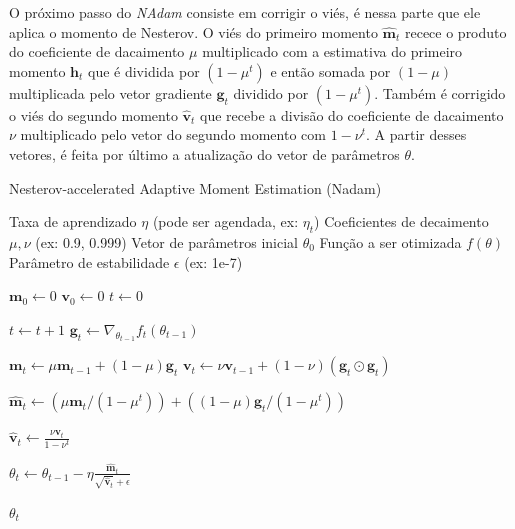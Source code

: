 O próximo passo do \textit{NAdam} consiste em corrigir o viés, é nessa parte que ele aplica o momento de Nesterov. O viés do primeiro momento $\mathbf{\hat{m}}_t$ recece o produto do coeficiente de dacaimento $\mu$ multiplicado com a estimativa do primeiro momento $\mathbf{h}_t$ que é dividida por $(1 - \mu^t)$ e então somada por $(1 - \mu)$ multiplicada pelo vetor gradiente $\mathbf{g}_t$ dividido por $(1 - \mu^t)$. Também é corrigido o viés do segundo momento $\mathbf{\hat{v}}_t$ que recebe a divisão do coeficiente de dacaimento $\nu$ multiplicado pelo vetor do segundo momento com $1 - \nu^t$. A partir desses vetores, é feita por último a atualização do vetor de parâmetros $\theta$.

\begin{algorithm}[H]
    \caption{Nesterov-accelerated Adaptive Moment Estimation (Nadam)}
    \label{alg:nadam}
    \begin{algorithmic}[1]

    \Require Taxa de aprendizado $\eta$ (pode ser agendada, ex: $\eta_t$)
    \Require Coeficientes de decaimento $\mu, \nu$ (ex: 0.9, 0.999)
    \Require Vetor de parâmetros inicial $\theta_0$
    \Require Função a ser otimizada $f(\theta)$
    \Require Parâmetro de estabilidade $\epsilon$ (ex: 1e-7)

    \State $\mathbf{m}_0 \leftarrow 0$ 
    \State $\mathbf{v}_0 \leftarrow 0$ 
    \State $t \leftarrow 0$ 

        \State $t \leftarrow t + 1$
        \State $\mathbf{g}_t \leftarrow \nabla_{\theta_{t-1}} f_t(\theta_{t-1})$
        
        \State $\mathbf{m}_t \leftarrow \mu \mathbf{m}_{t-1} + (1 - \mu) \mathbf{g}_t$
        \State $\mathbf{v}_t \leftarrow \nu \mathbf{v}_{t-1} + (1 - \nu) (\mathbf{g}_t \odot \mathbf{g}_t)$
        
        \State $\mathbf{\hat{m}}_t \leftarrow (\mu \mathbf{m}_t / (1 - \mu^t)) + ((1 - \mu) \mathbf{g}_t / (1 - \mu^t))$
        
        \State $\mathbf{\hat{v}}_t \leftarrow \frac{\nu \mathbf{v}_t}{1 - \nu^t}$
        
        \State $\theta_t \leftarrow \theta_{t-1} - \eta \frac{\mathbf{\hat{m}}_t}{\sqrt{\mathbf{\hat{v}}_t} + \epsilon}$
    \EndWhile

    \State \Return $\theta_t$ 
    \end{algorithmic}
\end{algorithm}

